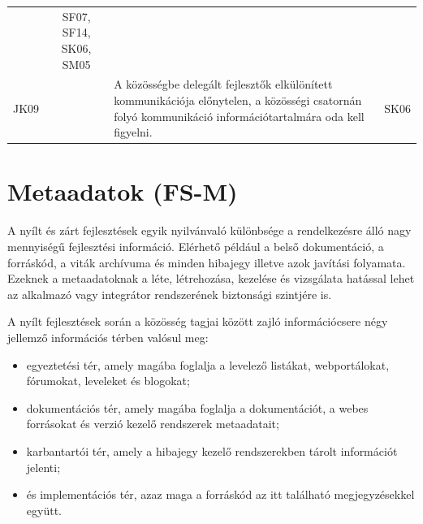 \documentclass[12pt,magyar,a4paper,oneside]{scrreprt}
\providecommand{\tightlist}{%
  \setlength{\itemsep}{0pt}\setlength{\parskip}{0pt}}
\begin{document}
\begin{longtable}[]{@{}rcll@{}}
\begin{minipage}[t]{0.69\columnwidth}
\end{minipage} & \begin{minipage}[t]{0.13\columnwidth}\raggedright
SF07, SF14, SK06, SM05\strut
\end{minipage}\tabularnewline
\begin{minipage}[t]{0.03\columnwidth}\raggedleft
JK09\strut
\end{minipage} & \begin{minipage}[t]{0.03\columnwidth}\centering
4\strut
\end{minipage} & \begin{minipage}[t]{0.69\columnwidth}\raggedright
A közösségbe delegált fejlesztők elkülönített kommunikációja előnytelen,
a közösségi csatornán folyó kommunikáció információtartalmára oda kell
figyelni.\strut
\end{minipage} & \begin{minipage}[t]{0.13\columnwidth}\raggedright
SK06\strut
\end{minipage}\tabularnewline
\bottomrule
\end{longtable}

\hypertarget{metaadatok-fs-m}{%
\section{Metaadatok (FS-M)}\label{metaadatok-fs-m}}

A nyílt és zárt fejlesztések egyik nyilvánvaló különbsége a
rendelkezésre álló nagy mennyiségű fejlesztési információ. Elérhető
például a belső dokumentáció, a forráskód, a viták archívuma és minden
hibajegy illetve azok javítási folyamata. Ezeknek a metaadatoknak a
léte, létrehozása, kezelése és vizsgálata hatással lehet az alkalmazó
vagy integrátor rendszerének biztonsági szintjére is.

A nyílt fejlesztések során a közösség tagjai között zajló
információcsere négy jellemző információs térben valósul meg:

\begin{itemize}
\tightlist
\item
  egyeztetési tér, amely magába foglalja a levelező listákat,
  webportálokat, fórumokat, leveleket és blogokat;
\item
  dokumentációs tér, amely magába foglalja a dokumentációt, a webes
  forrásokat és verzió kezelő rendszerek metaadatait;
\item
  karbantartói tér, amely a hibajegy kezelő rendszerekben tárolt
  információt jelenti;
\item
  és implementációs tér, azaz maga a forráskód az itt található
  megjegyzésekkel együtt.
\end{itemize}
\end{document}
